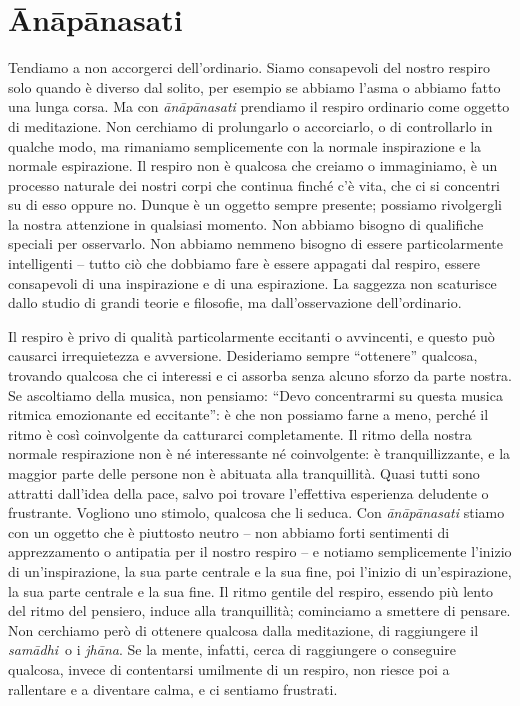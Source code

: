 \chapter{Ānāpānasati}

Tendiamo a non accorgerci dell'ordinario. Siamo consapevoli del nostro
respiro solo quando è diverso dal solito, per esempio se abbiamo l'asma
o abbiamo fatto una lunga corsa. Ma con \emph{ānāpānasati} prendiamo il
respiro ordinario come oggetto di meditazione. Non cerchiamo di
prolungarlo o accorciarlo, o di controllarlo in qualche modo, ma
rimaniamo semplicemente con la normale inspirazione e la normale
espirazione. Il respiro non è qualcosa che creiamo o immaginiamo, è un
processo naturale dei nostri corpi che continua finché c'è vita, che ci
si concentri su di esso oppure no. Dunque è un oggetto sempre presente;
possiamo rivolgergli la nostra attenzione in qualsiasi momento. Non
abbiamo bisogno di qualifiche speciali per osservarlo. Non abbiamo
nemmeno bisogno di essere particolarmente intelligenti -- tutto ciò che
dobbiamo fare è essere appagati dal respiro, essere consapevoli di una
inspirazione e di una espirazione. La saggezza non scaturisce dallo
studio di grandi teorie e filosofie, ma dall'osservazione
dell'ordinario.

Il respiro è privo di qualità particolarmente eccitanti o avvincenti, e
questo può causarci irrequietezza e avversione. Desideriamo sempre
``ottenere'' qualcosa, trovando qualcosa che ci interessi e ci assorba
senza alcuno sforzo da parte nostra. Se ascoltiamo della musica, non
pensiamo: ``Devo concentrarmi su questa musica ritmica emozionante ed
eccitante'': è che non possiamo farne a meno, perché il ritmo è così
coinvolgente da catturarci completamente. Il ritmo della nostra normale
respirazione non è né interessante né coinvolgente: è tranquillizzante,
e la maggior parte delle persone non è abituata alla tranquillità. Quasi
tutti sono attratti dall'idea della pace, salvo poi trovare l'effettiva
esperienza deludente o frustrante. Vogliono uno stimolo, qualcosa che li
seduca. Con \emph{ānāpānasati} stiamo con un oggetto che è piuttosto
neutro -- non abbiamo forti sentimenti di apprezzamento o antipatia per
il nostro respiro -- e notiamo semplicemente l'inizio di
un'inspirazione, la sua parte centrale e la sua fine, poi l'inizio di
un'espirazione, la sua parte centrale e la sua fine. Il ritmo gentile
del respiro, essendo più lento del ritmo del pensiero, induce alla
tranquillità; cominciamo a smettere di pensare. Non cerchiamo però di
ottenere qualcosa dalla meditazione, di raggiungere il \emph{samādhi}~o
i \emph{jhāna}. Se la mente, infatti, cerca di raggiungere o conseguire
qualcosa, invece di contentarsi umilmente di un respiro, non riesce poi
a rallentare e a diventare calma, e ci sentiamo frustrati.

